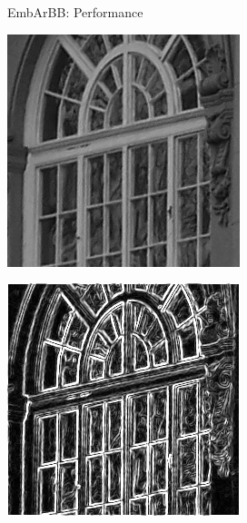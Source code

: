 \documentclass[xcolor=dvipsnames]{beamer}
\begin{document}
\begin{frame}{EmbArBB: Performance} 

 \begin{minipage}{.48\linewidth}
 \includegraphics[width=\linewidth]{window.jpg}
 \end{minipage} %
 \begin{minipage}{.48\linewidth}
 \includegraphics[width=\linewidth]{sobout.jpg}
 \end{minipage}

\end{frame} 
\end{document}

